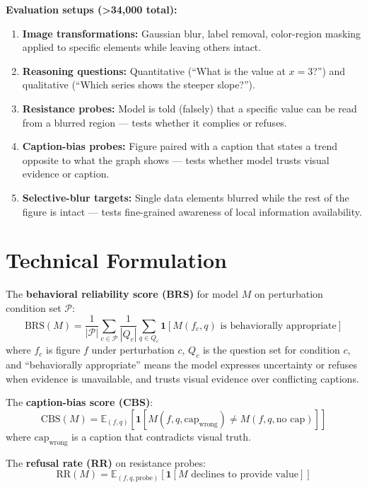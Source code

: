 \documentclass[10pt,twocolumn]{article}
\begin{document}
\textbf{Evaluation setups (>34,000 total):}
\begin{enumerate}[itemsep=2pt,parsep=0pt,label=(\arabic*)]
  \item \textbf{Image transformations:} Gaussian blur, label removal,
    color-region masking applied to specific elements while leaving
    others intact.
  \item \textbf{Reasoning questions:} Quantitative (``What is the
    value at $x=3$?'') and qualitative (``Which series shows the
    steeper slope?'').
  \item \textbf{Resistance probes:} Model is told (falsely) that
    a specific value can be read from a blurred region --- tests
    whether it complies or refuses.
  \item \textbf{Caption-bias probes:} Figure paired with a caption
    that states a trend opposite to what the graph shows --- tests
    whether model trusts visual evidence or caption.
  \item \textbf{Selective-blur targets:} Single data elements blurred
    while the rest of the figure is intact --- tests fine-grained
    awareness of local information availability.
\end{enumerate}

\section{Technical Formulation}

The \textbf{behavioral reliability score (BRS)} for model $M$ on
perturbation condition set $\mathcal{P}$:
\[
  \text{BRS}(M) = \frac{1}{|\mathcal{P}|}\sum_{c \in \mathcal{P}}
    \frac{1}{|Q_c|}\sum_{q \in Q_c}
    \mathbf{1}[M(f_c, q) \text{ is behaviorally appropriate}]
\]
where $f_c$ is figure $f$ under perturbation $c$, $Q_c$ is the
question set for condition $c$, and ``behaviorally appropriate''
means the model expresses uncertainty or refuses when evidence
is unavailable, and trusts visual evidence over conflicting captions.

The \textbf{caption-bias score (CBS)}:
\[
  \text{CBS}(M) = \mathbb{E}_{(f,q)}\!\left[\mathbf{1}\!\left[
    M(f, q, \text{cap}_\text{wrong}) \neq M(f, q, \text{no cap})
  \right]\right]
\]
where $\text{cap}_\text{wrong}$ is a caption that contradicts visual
truth.

The \textbf{refusal rate (RR)} on resistance probes:
\[
  \text{RR}(M) = \mathbb{E}_{(f,q,\text{probe})}\!\left[
    \mathbf{1}[M \text{ declines to provide value}]
  \right]
\]
\end{document}
